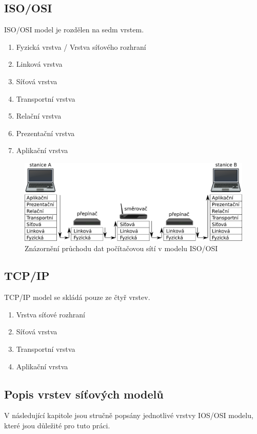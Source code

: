 \subsection{ISO/OSI}
ISO/OSI model je rozdělen na sedm vrstem.

\begin{enumerate}
	\item{Fyzická vrstva / Vrstva síťového rozhraní}
	\item{Linková vrstva}
	\item{Síťová vrstva}
	\item{Transportní vrstva}
	\item{Relační vrstva}
	\item{Prezentační vrstva}
	\item{Aplikační vrstva}
\end{enumerate}

\begin{figure}[!htb]
	\centering
	\includegraphics[scale=.25]{fig/layers.pdf}
	\caption{Znázornění průchodu dat počítačovou sítí v modelu ISO/OSI}
\end{figure}\label{fig:layers}

\subsection{TCP/IP}
TCP/IP model se skládá pouze ze čtyř vrstev.

\begin{enumerate}
	\item{Vrstva síťové rozhraní}
	\item{Síťová vrstva}
	\item{Transportní vrstva}
	\item{Aplikační vrstva}
\end{enumerate}

\subsection{Popis vrstev síťových modelů}
V následující kapitole jsou stručně popsány jednotlivé vrstvy IOS/OSI modelu,
které jsou důležité pro tuto práci.

